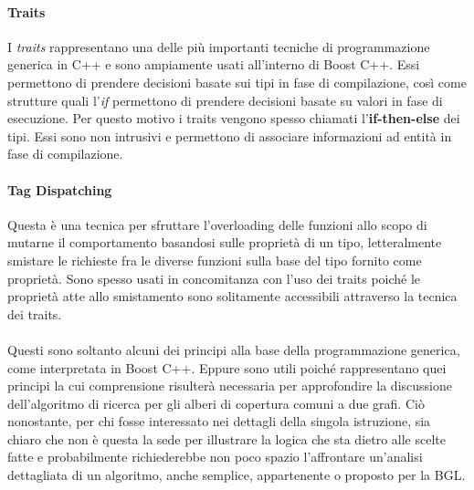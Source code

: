 \paragraph{Traits} I \textit{traits} rappresentano una delle più importanti tecniche di programmazione generica in C++ e sono ampiamente usati all'interno di Boost C++. Essi permettono di prendere decisioni basate sui tipi in fase di compilazione, così come strutture quali l'\textit{if} permettono di prendere decisioni basate su valori in fase di esecuzione. Per questo motivo i traits vengono spesso chiamati l'\textbf{if-then-else} dei tipi. Essi sono non intrusivi e permettono di associare informazioni ad entità in fase di compilazione.

\paragraph{Tag Dispatching} Questa è una tecnica per sfruttare l'overloading delle funzioni allo scopo di mutarne il comportamento basandosi sulle proprietà di un tipo, letteralmente smistare le richieste fra le diverse funzioni sulla base del tipo fornito come proprietà. Sono spesso usati in concomitanza con l'uso dei traits poiché le proprietà atte allo smistamento sono solitamente accessibili attraverso la tecnica dei traits.

\paragraph{}
Questi sono soltanto alcuni dei principi alla base della programmazione generica, come interpretata in Boost C++. Eppure sono utili poiché rappresentano quei principi la cui comprensione risulterà necessaria per approfondire la discussione dell'algoritmo di ricerca per gli alberi di copertura comuni a due grafi. Ciò nonostante, per chi fosse interessato nei dettagli della singola istruzione, sia chiaro che non è questa la sede per illustrare la logica che sta dietro alle scelte fatte e probabilmente richiederebbe non poco spazio l'affrontare un'analisi dettagliata di un algoritmo, anche semplice, appartenente o proposto per la BGL.

\paragraph{}

